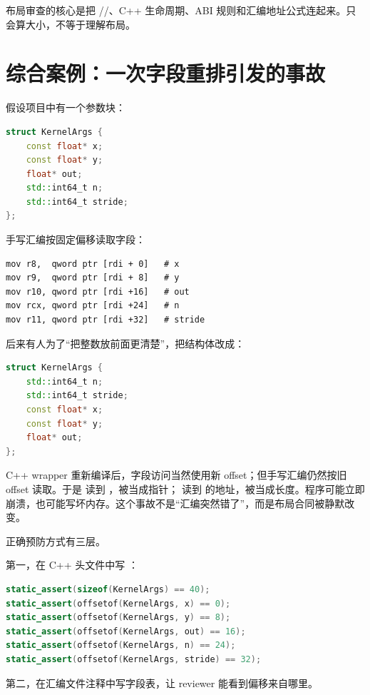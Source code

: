 \begin{keyidea}
布局审查的核心是把 //、C++ 生命周期、ABI 规则和汇编地址公式连起来。只会算大小，不等于理解布局。
\end{keyidea}

\section{综合案例：一次字段重排引发的事故}

假设项目中有一个参数块：

\begin{lstlisting}[language=C++]
struct KernelArgs {
    const float* x;
    const float* y;
    float* out;
    std::int64_t n;
    std::int64_t stride;
};
\end{lstlisting}

手写汇编按固定偏移读取字段：

\begin{lstlisting}
mov r8,  qword ptr [rdi + 0]   # x
mov r9,  qword ptr [rdi + 8]   # y
mov r10, qword ptr [rdi +16]   # out
mov rcx, qword ptr [rdi +24]   # n
mov r11, qword ptr [rdi +32]   # stride
\end{lstlisting}

后来有人为了“把整数放前面更清楚”，把结构体改成：

\begin{lstlisting}[language=C++]
struct KernelArgs {
    std::int64_t n;
    std::int64_t stride;
    const float* x;
    const float* y;
    float* out;
};
\end{lstlisting}

C++ wrapper 重新编译后，字段访问当然使用新 offset；但手写汇编仍然按旧 offset 读取。于是  读到 ，被当成指针； 读到  的地址，被当成长度。程序可能立即崩溃，也可能写坏内存。这个事故不是“汇编突然错了”，而是布局合同被静默改变。

正确预防方式有三层。

第一，在 C++ 头文件中写 ：

\begin{lstlisting}[language=C++]
static_assert(sizeof(KernelArgs) == 40);
static_assert(offsetof(KernelArgs, x) == 0);
static_assert(offsetof(KernelArgs, y) == 8);
static_assert(offsetof(KernelArgs, out) == 16);
static_assert(offsetof(KernelArgs, n) == 24);
static_assert(offsetof(KernelArgs, stride) == 32);
\end{lstlisting}

第二，在汇编文件注释中写字段表，让 reviewer 能看到偏移来自哪里。


